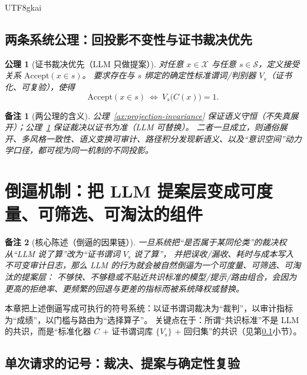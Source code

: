 \documentclass[12pt]{article}
\newtheorem{axiom}{公理}[section]
\newtheorem{remark}{备注}[section]
\begin{document}
\begin{CJK*}{UTF8}{gkai}
\subsection{两条系统公理：回投影不变性与证书裁决优先}
\label{subsec:two-axioms}

\begin{axiom}[证书裁决优先（LLM 只做提案）]
\label{ax:certificate-decision-priority}
对任意 $x\in\mathcal{X}$ 与任意 $s\in\mathcal{S}$，定义接受关系 $\mathrm{Accept}(x\in s)$。
要求存在与 $s$ 绑定的确定性标准谓词/判别器 $V_s$（证书化、可复验），使得
\[
\mathrm{Accept}(x\in s)\ \Longleftrightarrow\ V_s\bigl(C(x)\bigr)=1.
\]
\end{axiom}

\begin{remark}[两公理的含义]
公理~\ref{ax:projection-invariance} 保证语义守恒（不失真展开）；公理~\ref{ax:certificate-decision-priority} 保证裁决以证书为准（LLM 可替换）。
二者一旦成立，则通俗展开、多风格一致性、语义变换可审计、路径积分发现新语义、以及“意识空间”动力学口径，都可视为同一机制的不同投影。
\end{remark}

\clearpage

\section{倒逼机制：把 LLM 提案层变成可度量、可筛选、可淘汰的组件}
\label{sec:selection-pressure-llm-proposal-layer}

\begin{remark}[核心陈述（倒逼的因果链）]
一旦系统把“是否属于某同伦类”的裁决权从“LLM 说了算”改为“证书谓词 $V_s$ 说了算”，
并把误收/漏收、耗时与成本写入不可变审计日志，那么 LLM 的行为就会被自然倒逼为一个可度量、可筛选、可淘汰的提案层：
不够快、不够稳或不贴近共识标准的模型/提示/路由组合，会因为更高的拒绝率、更频繁的回退与更差的指标而被系统降权或替换。
\end{remark}

本章把上述倒逼写成可执行的符号系统：以证书谓词裁决为“裁判”，以审计指标为“成绩”，以门槛与路由为“选择算子”。
关键点在于：所谓“共识标准”不是 LLM 的共识，而是“标准化器 $C$ + 证书谓词库 $\{V_s\}$ + 回归集”的共识（见第\ref{subsec:two-axioms}小节）。

\subsection{单次请求的记号：裁决、提案与确定性复验}
\label{subsec:single-request-notation}


\end{CJK*}
\end{document}
